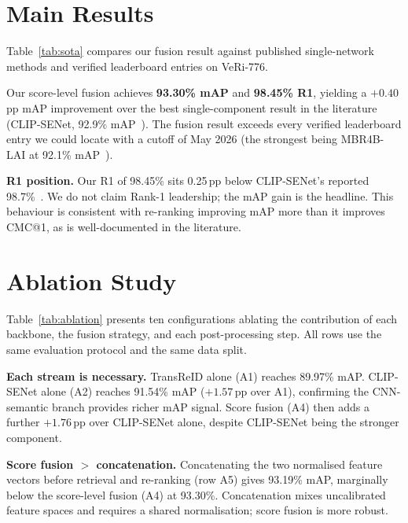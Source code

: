\documentclass{ieeeaccess}
\newcommand{\ourmap}{93.30}
\newcommand{\ourrank}{98.45}
\newcommand{\trmap}{89.97}
\newcommand{\csmap}{91.54}   %
\newcommand{\cspaper}{92.9}  %
\newcommand{\mbrmap}{92.1}   %
\begin{document}
\section{Main Results}
\label{sec:results}

Table~\ref{tab:sota} compares our fusion result against published
single-network methods and verified leaderboard entries on VeRi-776.



Our score-level fusion achieves \textbf{\ourmap\% mAP} and
\textbf{\ourrank\% R1}, yielding a $+0.40$\,pp mAP improvement over
the best single-component result in the literature (CLIP-SENet,
\cspaper\% mAP~\cite{clipsenet}).
The fusion result exceeds every verified leaderboard entry we could
locate with a cutoff of May 2026 (the strongest being MBR4B-LAI at
\mbrmap\% mAP~\cite{mbr4blai}).

\textbf{R1 position.}
Our R1 of \ourrank\% sits 0.25\,pp below CLIP-SENet's reported
98.7\%~\cite{clipsenet}.
We do not claim Rank-1 leadership; the mAP gain is the headline.
This behaviour is consistent with re-ranking improving mAP
more than it improves CMC@1, as is well-documented in the literature.

\section{Ablation Study}
\label{sec:ablation}

Table~\ref{tab:ablation} presents ten configurations ablating the
contribution of each backbone, the fusion strategy, and each
post-processing step.
All rows use the same evaluation protocol and the same data split.



\textbf{Each stream is necessary.}
TransReID alone (A1) reaches \trmap\% mAP.
CLIP-SENet alone (A2) reaches \csmap\% mAP ($+1.57$\,pp over A1),
confirming the CNN-semantic branch provides richer mAP signal.
Score fusion (A4) then adds a further $+1.76$\,pp over CLIP-SENet alone,
despite CLIP-SENet being the stronger component.

\textbf{Score fusion $>$ concatenation.}
Concatenating the two normalised feature vectors before retrieval
and re-ranking (row A5) gives 93.19\% mAP, marginally below the
score-level fusion (A4) at \ourmap\%.
Concatenation mixes uncalibrated feature spaces and requires a
shared normalisation; score fusion is more robust.
\end{document}
